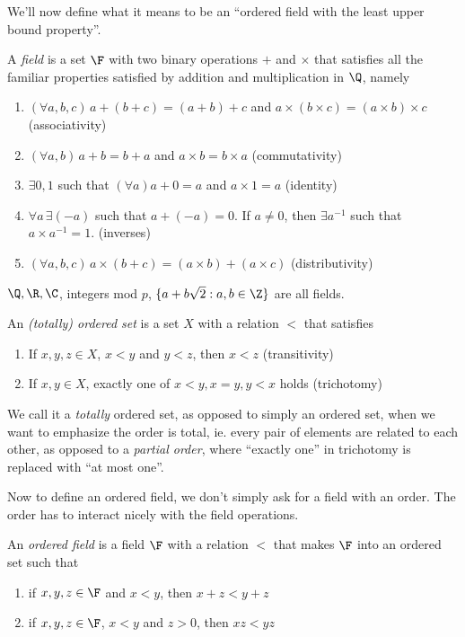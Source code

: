 \documentclass[a4paper]{article}
\begin{document}
We'll now define what it means to be an ``ordered field with the least upper bound property''.
\begin{defi}[Field]
  A \emph{field} is a set $\F$ with two binary operations $+$ and $\times$ that satisfies all the familiar properties satisfied by addition and multiplication in $\Q$, namely
  \begin{enumerate}
    \item $(\forall a, b, c)\,a + (b + c) = (a + b) + c$ and $a\times (b\times c) = (a\times b)\times c$ \hfill (associativity)
    \item $(\forall a, b)\,a + b = b + a$ and $a\times b= b\times a$ \hfill (commutativity)
    \item $\exists 0, 1$ such that $(\forall a)a + 0 = a$ and $a\times 1 = a$ \hfill (identity)
    \item $\forall a\,\exists (-a)$ such that $a + (-a) = 0$. If $a\not= 0$, then $\exists a^{-1}$ such that $a\times a^{-1} = 1$. \hfill (inverses)
    \item $(\forall a, b, c)\, a\times (b + c) = (a\times b) + (a\times c)$ \hfill (distributivity)
  \end{enumerate}
\end{defi}

\begin{eg}
  $\Q, \R, \C$, integers mod $p$, $\{a + b\sqrt{2}: a, b\in \Z\}$ are all fields.
\end{eg}

\begin{defi}
  An \emph{(totally) ordered set} is a set $X$ with a relation $<$ that satisfies
  \begin{enumerate}
    \item If $x, y, z\in X$, $x < y$ and $y < z$, then $x < z$ \hfill (transitivity)
    \item If $x, y\in X$, exactly one of $x < y, x = y, y < x$ holds \hfill (trichotomy)
  \end{enumerate}
\end{defi}
We call it a \emph{totally} ordered set, as opposed to simply an ordered set, when we want to emphasize the order is total, ie. every pair of elements are related to each other, as opposed to a \emph{partial order}, where ``exactly one'' in trichotomy is replaced with ``at most one''.

Now to define an ordered field, we don't simply ask for a field with an order. The order has to interact nicely with the field operations.
\begin{defi}
  An \emph{ordered field} is a field $\F$ with a relation $<$ that makes $\F$ into an ordered set such that
  \begin{enumerate}
    \item if $x, y, z \in \F$ and $x < y$, then $x + z < y + z$
    \item if $x, y, z \in \F$, $x < y$ and $z > 0$, then $xz < yz$
  \end{enumerate}
\end{defi}
\end{document}
